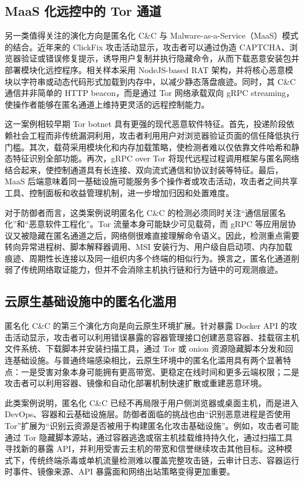 \subsection{MaaS 化远控中的 Tor 通道}

另一类值得关注的演化方向是匿名化 C\&C 与 Malware-as-a-Service（MaaS）模式的结合。近年来的 ClickFix 攻击活动显示，攻击者可以通过伪造 CAPTCHA、浏览器验证或错误修复提示，诱导用户复制并执行隐藏命令，从而下载恶意安装包并部署模块化远控程序。相关样本采用 NodeJS-based RAT 架构，并将核心恶意模块以字符串或动态代码形式加载到内存中，以减少静态落盘痕迹。同时，其 C\&C 通信并非简单的 HTTP beacon，而是通过 Tor 网络承载双向 gRPC streaming，使操作者能够在匿名通道上维持更灵活的远程控制能力。

这一案例相较早期 Tor botnet 具有更强的现代恶意软件特征。首先，投递阶段依赖社会工程而非传统漏洞利用，攻击者利用用户对浏览器验证页面的信任降低执行门槛。其次，载荷采用模块化和内存加载策略，使检测者难以仅依靠文件哈希和静态特征识别全部功能。再次，gRPC over Tor 将现代远程过程调用框架与匿名网络结合起来，使控制通道具有长连接、双向流式通信和协议封装等特征。最后，MaaS 后端意味着同一基础设施可能服务多个操作者或攻击活动，攻击者之间共享工具、控制面板和收益管理机制，进一步增加归因和处置难度。

对于防御者而言，这类案例说明匿名化 C\&C 的检测必须同时关注“通信层匿名化”和“恶意软件工程化”。Tor 流量本身可能缺少可见载荷，而 gRPC 等应用层协议又被隐藏在匿名通道之后，网络侧很难直接理解命令语义。因此，检测重点需要转向异常进程树、脚本解释器调用、MSI 安装行为、用户级自启动项、内存加载痕迹、周期性长连接以及同一组织内多个终端的相似行为。换言之，匿名化通道削弱了传统网络取证能力，但并不会消除主机执行链和行为链中的可观测痕迹。

\subsection{云原生基础设施中的匿名化滥用}

匿名化 C&C 的第三个演化方向是向云原生环境扩展。针对暴露 Docker API 的攻击活动显示，攻击者可以利用错误暴露的容器管理接口创建恶意容器、挂载宿主机文件系统、下载脚本并安装扫描工具，通过 Tor 或 onion 资源隐藏脚本分发和回连基础设施。与普通终端感染相比，云原生环境中的匿名化滥用具有两个显著特点：一是受害对象本身可能拥有更高带宽、更稳定在线时间和更多云端权限；二是攻击者可以利用容器、镜像和自动化部署机制快速扩散或重建恶意环境。

此类案例说明，匿名化 C\&C 已经不再局限于用户侧浏览器或桌面主机，而是进入 DevOps、容器和云基础设施层。防御者面临的挑战也由“识别恶意进程是否使用 Tor”扩展为“识别云资源是否被用于构建匿名化攻击基础设施”。例如，攻击者可能通过 Tor 隐藏脚本源站，通过容器逃逸或宿主机挂载维持持久化，通过扫描工具寻找新的暴露 API，并利用受害云主机的带宽和信誉继续攻击其他目标。这种模式下，传统终端杀毒或单机流量检测难以覆盖完整攻击链，云审计日志、容器运行时事件、镜像来源、API 暴露面和网络出站策略变得更加重要。

